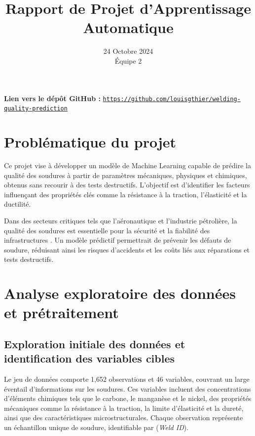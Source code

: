 \documentclass{article}
\title{\LARGE \textbf{Rapport de Projet d'Apprentissage Automatique}}
\date{\normalsize 24 Octobre 2024 \\ \small Équipe 2}
\newcommand{\bcite}[1]{\textbf{\cite{#1}}}
\begin{document}
\maketitle
\tableofcontents

\vfill
\noindent
\textbf{Lien vers le dépôt GitHub :} \href{https://github.com/louisgthier/welding-quality-prediction}{\texttt{https://github.com/louisgthier/welding-quality-prediction}}
\vspace*{1cm} 

\newpage
\section{Problématique du projet}

Ce projet vise à développer un modèle de Machine Learning capable de prédire la qualité des soudures à partir de paramètres mécaniques, physiques et chimiques, obtenus sans recourir à des tests destructifs. L'objectif est d'identifier les facteurs influençant des propriétés clés comme la résistance à la traction, l'élasticité et la ductilité.

Dans des secteurs critiques tels que l'aéronautique et l'industrie pétrolière, la qualité des soudures est essentielle pour la sécurité et la fiabilité des infrastructures \bcite{olympus,controle-visuel}. Un modèle prédictif permettrait de prévenir les défauts de soudure, réduisant ainsi les risques d'accidents et les coûts liés aux réparations et tests destructifs.

\section{Analyse exploratoire des données et prétraitement}

\subsection{Exploration initiale des données et identification des variables cibles}

Le jeu de données comporte 1,652 observations et 46 variables, couvrant un large éventail d'informations sur les soudures. Ces variables incluent des concentrations d'éléments chimiques tels que le carbone, le manganèse et le nickel, des propriétés mécaniques comme la résistance à la traction, la limite d’élasticité et la dureté, ainsi que des caractéristiques microstructurales. Chaque observation représente un échantillon unique de soudure, identifiable par (\textit{Weld ID}).
\end{document}
